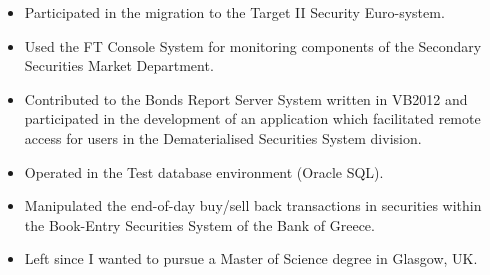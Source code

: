 {
{\begin{flushleft}
\begin{itemize}
    \item Participated in the migration to the Target II Security Euro-system.
    \item Used the FT Console System for monitoring components of the Secondary Securities Market Department.
    \item Contributed to the Bonds Report Server System written in VB2012 and participated in the development of an application which facilitated remote access for users in the Dematerialised Securities System division.
    \item Operated in the Test database environment (Oracle SQL).
    \item Manipulated the end-of-day buy/sell back transactions in securities within the Book-Entry Securities System of the Bank of Greece.
    \item Left since I wanted to pursue a Master of Science degree in Glasgow, UK. 
\end{itemize}
\end{flushleft} } }
